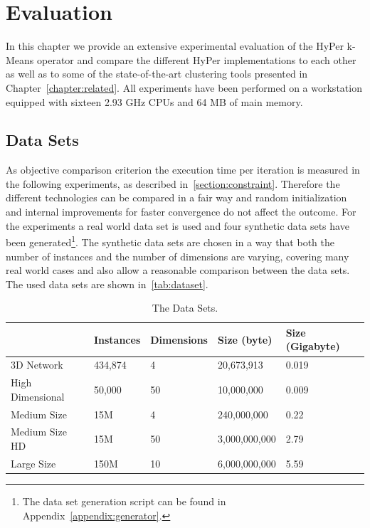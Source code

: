 \chapter{Evaluation}\label{chapter:evaluation}

In this chapter we provide an extensive experimental evaluation of the HyPer k-Means operator and compare the different HyPer implementations to each other as well as to some of the state-of-the-art clustering tools presented in Chapter~\ref{chapter:related}. All experiments have been performed on a workstation equipped with sixteen 2.93 GHz CPUs and 64 MB of main memory.


\section{Data Sets}
As objective comparison criterion the execution time per iteration is measured in the following experiments, as described in~\ref{section:constraint}. Therefore the different technologies can be compared in a fair way and random initialization and internal improvements for faster convergence do not affect the outcome. For the experiments a real world data set is used and four synthetic data sets have been generated\footnote{The data set generation script can be found in Appendix~\ref{appendix:generator}.}. The synthetic data sets are chosen in a way that both the number of instances and the number of dimensions are varying, covering many real world cases and also allow a reasonable comparison between the data sets. The used data sets are shown in~\autoref{tab:dataset}.

\begin{table}[htsb]
  \caption[The Data Sets]{The Data Sets.}\label{tab:dataset}
  \centering
  \begin{tabular}{l l l l l}
    \toprule
      & Instances & Dimensions & Size (byte) & Size (Gigabyte) \\
    \midrule
      3D Network        & 434,874    & 4     & 20,673,913 & 0.019 \\
      High Dimensional  & 50,000     & 50    & 10,000,000 & 0.009 \\
      Medium Size       & 15M       & 4     & 240,000,000 & 0.22 \\
      Medium Size HD    & 15M       & 50    & 3,000,000,000 & 2.79 \\
      Large Size        & 150M      & 10    & 6,000,000,000 & 5.59 \\
    \bottomrule
  \end{tabular}
\end{table}



